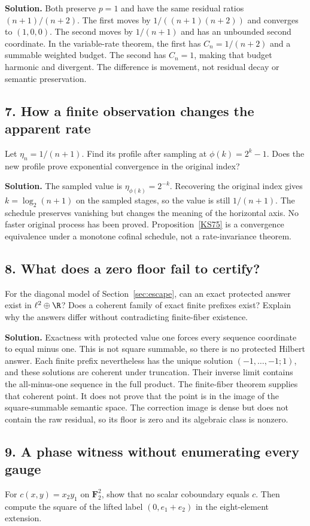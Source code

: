 \textbf{Solution.} Both preserve $p=1$ and have the same residual ratios $(n+1)/(n+2)$. The first moves by $1/((n+1)(n+2))$ and converges to $(1,0,0)$. The second moves by $1/(n+1)$ and has an unbounded second coordinate. In the variable-rate theorem, the first has $C_n=1/(n+2)$ and a summable weighted budget. The second has $C_n=1$, making that budget harmonic and divergent. The difference is movement, not residual decay or semantic preservation.

\subsection*{7. How a finite observation changes the apparent rate}
Let $\eta_n=1/(n+1)$. Find its profile after sampling at $\phi(k)=2^k-1$. Does the new profile prove exponential convergence in the original index?

\textbf{Solution.} The sampled value is $\eta_{\phi(k)}=2^{-k}$. Recovering the original index gives $k=\log_2(n+1)$ on the sampled stages, so the value is still $1/(n+1)$. The schedule preserves vanishing but changes the meaning of the horizontal axis. No faster original process has been proved. Proposition~\ref{KS75} is a convergence equivalence under a monotone cofinal schedule, not a rate-invariance theorem.

\subsection*{8. What does a zero floor fail to certify?}
For the diagonal model of Section~\ref{sec:escape}, can an exact protected answer exist in $\ell^2\oplus\R$? Does a coherent family of exact finite prefixes exist? Explain why the answers differ without contradicting finite-fiber existence.

\textbf{Solution.} Exactness with protected value one forces every sequence coordinate to equal minus one. This is not square summable, so there is no protected Hilbert answer. Each finite prefix nevertheless has the unique solution $(-1,\ldots,-1;1)$, and these solutions are coherent under truncation. Their inverse limit contains the all-minus-one sequence in the full product. The finite-fiber theorem supplies that coherent point. It does not prove that the point is in the image of the square-summable semantic space. The correction image is dense but does not contain the raw residual, so its floor is zero and its algebraic class is nonzero.

\subsection*{9. A phase witness without enumerating every gauge}
For $c(x,y)=x_2y_1$ on $\mathbf F_2^2$, show that no scalar coboundary equals $c$. Then compute the square of the lifted label $(0,e_1+e_2)$ in the eight-element extension.

